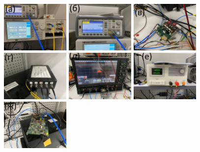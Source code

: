 \documentclass[12pt]{article}
\begin{document}
\begin{figure}[h]\centering
	\includegraphics[width=0.3\textwidth]{attenuators}
    \includegraphics[width=0.3\textwidth]{frequency_meter}
    \includegraphics[width=0.3\textwidth]{laser_driver}
    \includegraphics[width=0.3\textwidth]{optical_scheme}
    \includegraphics[width=0.3\textwidth]{oscill}
    \includegraphics[width=0.3\textwidth]{power_supply}
    \includegraphics[width=0.3\textwidth]{synchronization}

\end{figure}
\end{document}
